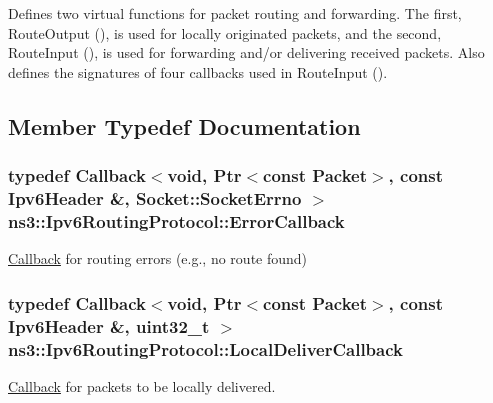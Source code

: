 Defines two virtual functions for packet routing and forwarding. The first, Route\+Output (), is used for locally originated packets, and the second, Route\+Input (), is used for forwarding and/or delivering received packets. Also defines the signatures of four callbacks used in Route\+Input (). 

\subsection{Member Typedef Documentation}
\subsubsection[{\texorpdfstring{Error\+Callback}{ErrorCallback}}]{\setlength{\rightskip}{0pt plus 5cm}typedef {\bf Callback}$<$void, {\bf Ptr}$<$const {\bf Packet}$>$, const {\bf Ipv6\+Header} \&, {\bf Socket\+::\+Socket\+Errno} $>$ {\bf ns3\+::\+Ipv6\+Routing\+Protocol\+::\+Error\+Callback}}\hypertarget{classns3_1_1Ipv6RoutingProtocol_abfdf43594e2ae97e1a4dc340e3a086a5}{}\label{classns3_1_1Ipv6RoutingProtocol_abfdf43594e2ae97e1a4dc340e3a086a5}


\hyperlink{classns3_1_1Callback}{Callback} for routing errors (e.\+g., no route found) 

\subsubsection[{\texorpdfstring{Local\+Deliver\+Callback}{LocalDeliverCallback}}]{\setlength{\rightskip}{0pt plus 5cm}typedef {\bf Callback}$<$void, {\bf Ptr}$<$const {\bf Packet}$>$, const {\bf Ipv6\+Header} \&, uint32\+\_\+t $>$ {\bf ns3\+::\+Ipv6\+Routing\+Protocol\+::\+Local\+Deliver\+Callback}}\hypertarget{classns3_1_1Ipv6RoutingProtocol_a93f6c06be1e024747e95f4299eba74a6}{}\label{classns3_1_1Ipv6RoutingProtocol_a93f6c06be1e024747e95f4299eba74a6}


\hyperlink{classns3_1_1Callback}{Callback} for packets to be locally delivered. 

